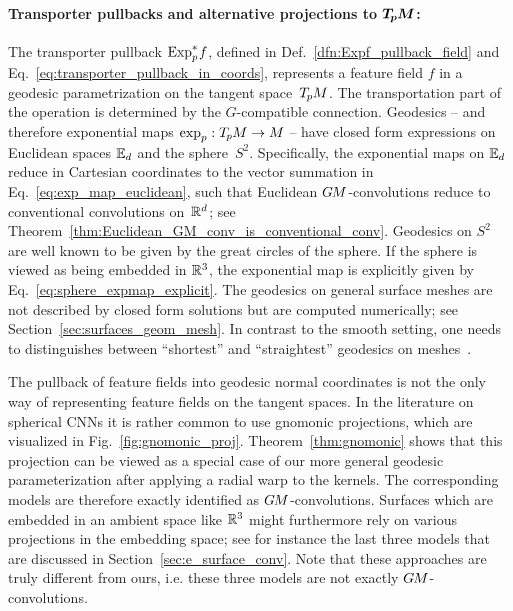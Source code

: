 \paragraph{Transporter pullbacks and alternative projections to $\boldsymbol{T_{\mkern-1.5mu p}\mkern-.5muM}$:}
The transporter pullback $\operatorname{Exp}^*_p\mkern-2mu f$, defined in Def.~\ref{dfn:Expf_pullback_field} and Eq.~\eqref{eq:transporter_pullback_in_coords}, represents a feature field $f$ in a geodesic parametrization on the tangent space~$T_{\mkern-1.5mu p}\mkern-.5muM$.
The transportation part of the operation is determined by the $G$-compatible connection.
Geodesics -- and therefore exponential maps $\exp_p: T_{\mkern-1.5mu p}\mkern-.5muM\to M$ -- have closed form expressions on Euclidean spaces $\mathbb{E}_d$ and the sphere~$S^2$.
Specifically, the exponential maps on $\mathbb{E}_d$ reduce in Cartesian coordinates to the vector summation in Eq.~\eqref{eq:exp_map_euclidean}, such that Euclidean $G\mkern-1.4muM$-convolutions reduce to conventional convolutions on~$\mathbb{R}^d$; see Theorem~\ref{thm:Euclidean_GM_conv_is_conventional_conv}.
Geodesics on $S^2$ are well known to be given by the great circles of the sphere.
If the sphere is viewed as being embedded in $\mathbb{R}^3$, the exponential map is explicitly given by Eq.~\eqref{eq:sphere_expmap_explicit}.
The geodesics on general surface meshes are not described by closed form solutions but are computed numerically; see Section~\ref{sec:surfaces_geom_mesh}.
In contrast to the smooth setting, one needs to distinguishes between ``shortest'' and ``straightest'' geodesics on meshes~\cite{polthier1998straightest}.


The pullback of feature fields into geodesic normal coordinates is not the only way of representing feature fields on the tangent spaces.
In the literature on spherical CNNs it is rather common to use gnomonic projections, which are visualized in Fig.~\ref{fig:gnomonic_proj}.
Theorem~\ref{thm:gnomonic} shows that this projection can be viewed as a special case of our more general geodesic parameterization after applying a radial warp to the kernels.
The corresponding models are therefore exactly identified as $G\mkern-1.4muM$-convolutions.
Surfaces which are embedded in an ambient space like $\mathbb{R}^3$ might furthermore rely on various projections in the embedding space; see for instance the last three models that are discussed in Section~\ref{sec:e_surface_conv}.
Note that these approaches are truly different from ours, i.e. these three models are not exactly $G\mkern-1.4muM$-convolutions.







